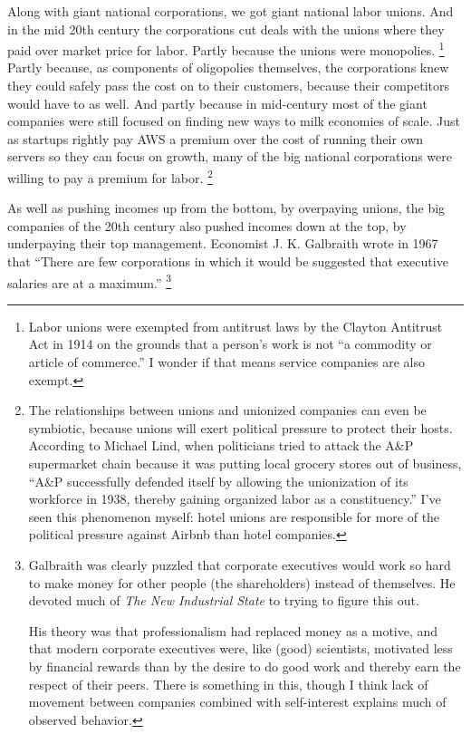 Along with giant national corporations, we got giant national labor
unions. And in the mid 20th century the corporations cut deals with the
unions where they paid over market price for labor. Partly because the
unions were monopolies. \footnote{Labor unions were exempted from antitrust laws by the Clayton
Antitrust Act in 1914 on the grounds that a person's work is not ``a
commodity or article of commerce.'' I wonder if that means service
companies are also exempt.} Partly because, as
components of oligopolies themselves, the corporations knew they could
safely pass the cost on to their customers, because their competitors
would have to as well. And partly because in mid-century most of the
giant companies were still focused on finding new ways to milk economies
of scale. Just as startups rightly pay AWS a premium over the cost of
running their own servers so they can focus on growth, many of the big
national corporations were willing to pay a premium for labor.
\footnote{The relationships between unions and unionized companies can
even be symbiotic, because unions will exert political pressure to
protect their hosts. According to Michael Lind, when politicians tried
to attack the A\&P supermarket chain because it was putting local
grocery stores out of business, ``A\&P successfully defended itself by
allowing the unionization of its workforce in 1938, thereby gaining
organized labor as a constituency.'' I've seen this phenomenon myself:
hotel unions are responsible for more of the political pressure against
Airbnb than hotel companies.}

As well as pushing incomes up from the bottom, by overpaying unions, the
big companies of the 20th century also pushed incomes down at the top,
by underpaying their top management. Economist J. K. Galbraith wrote in
1967 that ``There are few corporations in which it would be suggested
that executive salaries are at a maximum.'' \footnote{Galbraith was clearly puzzled that corporate executives would
work so hard to make money for other people (the shareholders) instead
of themselves. He devoted much of \emph{The New Industrial State} to
trying to figure this out.

His theory was that professionalism had replaced money as a motive, and
that modern corporate executives were, like (good) scientists, motivated
less by financial rewards than by the desire to do good work and thereby
earn the respect of their peers. There is something in this, though I
think lack of movement between companies combined with self-interest
explains much of observed behavior.}

